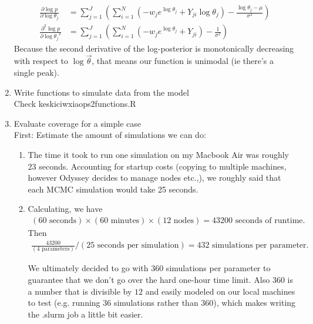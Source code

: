 \documentclass[paper=a4, fontsize=11pt]{scrartcl}
\newcommand{\parens}[1]{ \left( #1 \right) }
\begin{document}
\begin{enumerate}
\begin{align*}
        \frac{\partial{\log{p}}}{\partial{\log{\theta_j}}}
          &= \sum_{j=1}^J{
            \parens{
              \sum_{i=1}^N{ \parens{
                -w_je^{\log{\theta_j}} + Y_{ji}\log{\theta_j}
              }}
              - \frac{\log{\theta_j} - \mu}{\sigma^2}
            }
          } \\
        \frac{\partial^2{\log{p}}}{\partial{\log{\theta_j}}^2}
          &= \sum_{j=1}^J{
            \parens{
              \sum_{i=1}^N{ \parens{
                -w_je^{\log{\theta_j}} + Y_{ji}
              }}
              - \frac{1}{\sigma^2}
            }
          }
      \end{align*}
      Because the second derivative of the log-posterior is monotonically decreasing with respect to $\log{\vec{\theta}}$, that means our function is unimodal (ie there's a single peak).
    \item Write functions to simulate data from the model \\

      Check keskici\textunderscore wxiao\textunderscore ps2\textunderscore functions.R
    \item Evaluate coverage for a simple case \\

      First: Estimate the amount of simulations we can do:
        \begin{enumerate}
          \item The time it took to run one simulation on my Macbook Air was roughly 23 seconds. Accounting for startup costs (copying to multiple machines, however Odyssey decides to manage nodes etc.,), we roughly said that each MCMC simulation would take 25 seconds.
          \item Calculating, we have
            \begin{align*}
              (60 \text{ seconds}) \times (60 \text{ minutes}) \times (12 \text{ nodes}) = 43200 \text{ seconds of runtime.}
            \end{align*}
              Then
            \begin{align*}
              \frac{43200}{(4 \text{ parameters})} / (25 \text{ seconds per simulation}) = 432 \text{ simulations per parameter.}
            \end{align*}

          We ultimately decided to go with $360$ simulations per parameter to guarantee that we don't go over the hard one-hour time limit. Also $360$ is a number that is divisible by $12$ and easily modeled on our local machines to test (e.g. running 36 simulations rather than 360), which makes writing the .slurm job a little bit easier.
        \end{enumerate}



\end{enumerate}
\end{document}
